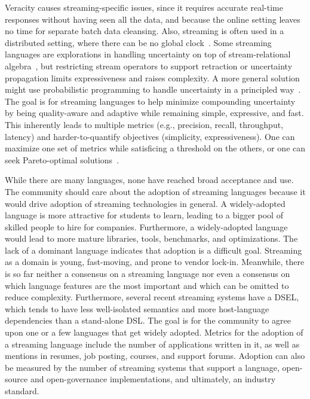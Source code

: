 Veracity causes streaming-specific issues, since it requires accurate
real-time responses without having seen all the data, and because the
online setting leaves no time for separate batch data cleansing. Also,
streaming is often used in a distributed setting, where there can be
no global clock~\cite{lamport_1978}. Some streaming languages are
explorations in handling uncertainty on top of stream-relational
algebra~\cite{tran_et_al_2010}, but restricting stream
operators to support retraction or uncertainty propagation limits
expressiveness and raises complexity. A more general solution might use
probabilistic programming to handle uncertainty in a principled
way~\cite{gordon_et_al_2014}. The goal is for streaming languages to help minimize compounding
uncertainty by being quality-aware and adaptive while remaining
simple, expressive, and fast. This inherently leads to multiple
metrics (e.g., precision, recall, throughput, latency) and
harder-to-quantify objectives (simplicity, expressiveness). One can
maximize one set of metrics while satisficing a threshold on the
others, or one can seek Pareto-optimal
solutions~\cite{zhang_hirzel_grove_2016}.

 While
there are many languages, none have reached broad acceptance and use.
The community should care about the adoption of streaming languages
because it would drive adoption of streaming technologies in general.
A widely-adopted language is more attractive for students to learn,
leading to a bigger pool of skilled people to hire for companies.
Furthermore, a widely-adopted language would lead to more
mature libraries, tools, benchmarks, and optimizations. The lack of a
dominant language indicates that adoption is a difficult goal. Streaming as a domain is young, fast-moving, and prone to vendor
lock-in. Meanwhile, there is so far neither a consensus on a
streaming language nor even a consensus on which language
features are the most important and which can be omitted to reduce
complexity. Furthermore, several recent streaming systems have a DSEL,
which tends to have less well-isolated semantics and more
host-language dependencies than a stand-alone DSL. The goal is for the community to agree upon one or a few languages that get
widely adopted. Metrics for the adoption of a streaming language include
the number of applications written in it,
as well as mentions in resumes, job posting, courses, and support
forums. Adoption can also be measured by the number of streaming systems that
support a language, open-source and open-governance implementations,
and ultimately, an industry standard.
\fi 
